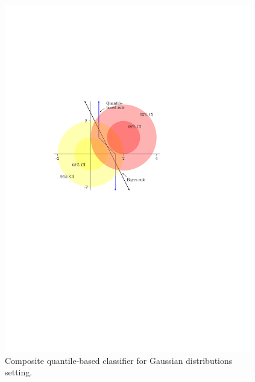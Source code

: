 \begin{figure}[ht]
  \caption{Composite quantile-based classifier for Gaussian distributions setting.}
  \label{fig:gaussian-classify}
  \centering
  \vspace{5mm}

  \begin{minipage}[t]{0.55\linewidth}
    \flushleft
    \includegraphics[width=0.96\textwidth]{gauss_ci}
  \end{minipage}
  \begin{minipage}[t]{0.44\linewidth}
    \flushright

\end{minipage}
\end{figure}
